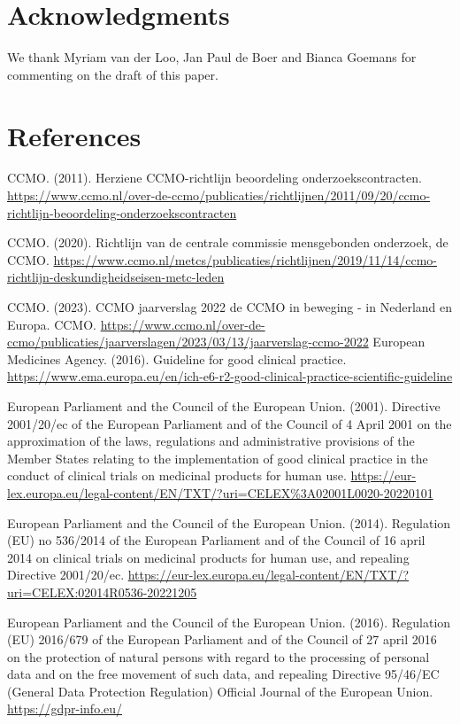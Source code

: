 \documentclass[authordate, meta, issue]{jote-new-article}
\begin{document}
\section{Acknowledgments}



We thank Myriam van der Loo, Jan Paul de Boer and Bianca Goemans for commenting on the draft of this paper.

\section{References}

CCMO. (2011). Herziene CCMO-richtlijn beoordeling onderzoekscontracten. \url{https://www.ccmo.nl/over-de-ccmo/publicaties/richtlijnen/2011/09/20/ccmo-richtlijn-beoordeling-onderzoekscontracten}

CCMO. (2020). Richtlijn van de centrale commissie mensgebonden onderzoek, de CCMO. \url{https://www.ccmo.nl/metcs/publicaties/richtlijnen/2019/11/14/ccmo-richtlijn-deskundigheidseisen-metc-leden}

CCMO. (2023). CCMO jaarverslag 2022 de CCMO in beweging - in Nederland en Europa. CCMO. \url{https://www.ccmo.nl/over-de-ccmo/publicaties/jaarverslagen/2023/03/13/jaarverslag-ccmo-2022} European Medicines Agency. (2016). Guideline for good clinical practice. \url{https://www.ema.europa.eu/en/ich-e6-r2-good-clinical-practice-scientific-guideline}

European Parliament and the Council of the European Union. (2001). Directive 2001/20/ec of the European Parliament and of the Council of 4 April 2001 on the approximation of the laws, regulations and administrative provisions of the Member States relating to the implementation of good clinical practice in the conduct of clinical trials on medicinal products for human use. \url{https://eur-lex.europa.eu/legal-content/EN/TXT/?uri=CELEX%3A02001L0020-20220101}

European Parliament and the Council of the European Union. (2014). Regulation (EU) no 536/2014 of the European Parliament and of the Council of 16 april 2014 on clinical trials on medicinal products for human use, and repealing Directive 2001/20/ec. \url{https://eur-lex.europa.eu/legal-content/EN/TXT/?uri=CELEX:02014R0536-20221205}

European Parliament and the Council of the European Union. (2016). Regulation (EU) 2016/679 of the European Parliament and of the Council of 27 april 2016 on the protection of natural persons with regard to the processing of personal data and on the free movement of such data, and repealing Directive 95/46/EC (General Data Protection Regulation) Official Journal of the European Union. \url{https://gdpr-info.eu/}
\end{document}

